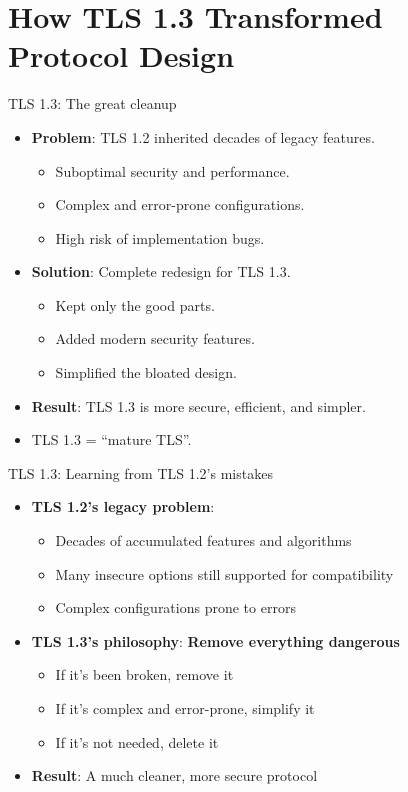 \documentclass[aspectratio=169, lualatex, handout]{beamer}
\begin{document}
\section{How TLS 1.3 Transformed Protocol Design}

\begin{frame}{TLS 1.3: The great cleanup}
	\begin{itemize}
		\item \textbf{Problem}: TLS 1.2 inherited decades of legacy features.
		      \begin{itemize}
			      \item Suboptimal security and performance.
			      \item Complex and error-prone configurations.
			      \item High risk of implementation bugs.
		      \end{itemize}
		\item \textbf{Solution}: Complete redesign for TLS 1.3.
		      \begin{itemize}
			      \item Kept only the good parts.
			      \item Added modern security features.
			      \item Simplified the bloated design.
		      \end{itemize}
		\item \textbf{Result}: TLS 1.3 is more secure, efficient, and simpler.
		\item TLS 1.3 = ``mature TLS''.
	\end{itemize}
\end{frame}

\begin{frame}{TLS 1.3: Learning from TLS 1.2's mistakes}
	\begin{itemize}
		\item \textbf{TLS 1.2's legacy problem}:
		      \begin{itemize}
			      \item Decades of accumulated features and algorithms
			      \item Many insecure options still supported for compatibility
			      \item Complex configurations prone to errors
		      \end{itemize}
		\item \textbf{TLS 1.3's philosophy}: \textbf{Remove everything dangerous}
		      \begin{itemize}
			      \item If it's been broken, remove it
			      \item If it's complex and error-prone, simplify it
			      \item If it's not needed, delete it
		      \end{itemize}
		\item \textbf{Result}: A much cleaner, more secure protocol
	\end{itemize}
\end{frame}
\end{document}
